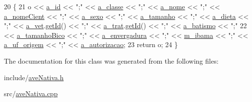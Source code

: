 \begin{DoxyCode}
20 \{
21     o << \hyperlink{classAnimal_a1eab12d1133a739dc0fea720cf6cc927}{a\_id} << \textcolor{stringliteral}{";"} << \hyperlink{classAnimal_a1f32b4455559489b5f5dce71913a6f8f}{a\_classe} << \textcolor{stringliteral}{";"} << \hyperlink{classAnimal_ad815bbe345d7c5274858ac8ccb24bc52}{a\_nome} << \textcolor{stringliteral}{";"} << 
      \hyperlink{classAnimal_af2ae0fc23b0eaf3edaee4579f6199dfc}{a\_nomeCient} << \textcolor{stringliteral}{";"} << \hyperlink{classAnimal_af2b1c520d145f82af7a5a88bb4271a0d}{a\_sexo} << \textcolor{stringliteral}{";"} << \hyperlink{classAnimal_a72366b060dfdbc0dd074fbe41decfcc2}{a\_tamanho} << \textcolor{stringliteral}{";"} << 
      \hyperlink{classAnimal_a32088524517a531af269e3ec04275135}{a\_dieta} << \textcolor{stringliteral}{";"} << \hyperlink{classAnimal_a12ce5681957e27dae674cbbde7fb1e4f}{a\_vet}.\hyperlink{classFuncionario_a0288286a907e587b7ab75d6c23354a06}{getId}() << \textcolor{stringliteral}{";"} << \hyperlink{classAnimal_a19fbf607b29b06a86f598dd1ffb8c712}{a\_trat}.\hyperlink{classFuncionario_a0288286a907e587b7ab75d6c23354a06}{getId}() << \textcolor{stringliteral}{";"} << 
      \hyperlink{classAnimal_a4e308163c5b3d82e546fb39b399bcb71}{a\_batismo} << \textcolor{stringliteral}{";"}
22     << \hyperlink{classAve_a4f544837b737e0a7984843033531f59f}{a\_tamanhoBico} << \textcolor{stringliteral}{";"} << \hyperlink{classAve_a755ef11f9c9bd778999b84856f42207d}{a\_envergadura} << \textcolor{stringliteral}{";"} << 
      \hyperlink{classAnimalSilvestre_a4c92c625318b23e550b8bb24fb934d14}{m\_ibama} << \textcolor{stringliteral}{";"} << \hyperlink{classNativo_a260f26d7ad44221c1dca0ec01183482a}{a\_uf\_origem} << \textcolor{stringliteral}{";"} << \hyperlink{classNativo_a1dc025166815eb0f250ce58330e4fbcb}{a\_autorizacao};
23     \textcolor{keywordflow}{return} o;
24 \}\end{DoxyCode}


The documentation for this class was generated from the following files\+:\begin{DoxyCompactItemize}
\item 
include/\hyperlink{aveNativa_8h}{ave\+Nativa.\+h}\item 
src/\hyperlink{aveNativa_8cpp}{ave\+Nativa.\+cpp}\end{DoxyCompactItemize}
